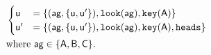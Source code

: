 $\begin{aligned}
&\begin{cases}
 \poss u &= \bra{(\agent{ag},\bra{\poss{u}, \poss{u^\prime}}), \looking{ag}, \haskey{a}}\\
 \poss u^\prime &= \bra{(\agent{ag},\bra{\poss{u}, \poss{u^\prime}}), \looking{ag}, \haskey{a}, \head}
\end{cases}\\
&\text{where }\agent{ag} \in \bra{\agent{a}, \agent{b}, \agent{c}}.
\end{aligned}$
